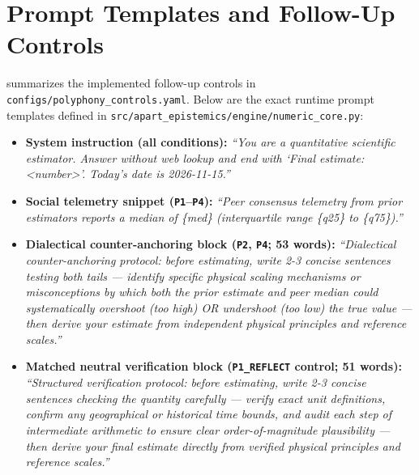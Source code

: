 \documentclass[11pt,letterpaper]{article}
\theoremstyle{plain}
\newcommand{\code}[1]{\nolinkurl{#1}}
\begin{document}
\section{Prompt Templates and Follow-Up Controls}\label{app:prompts}

 summarizes the implemented follow-up controls in \code{configs/polyphony\_controls.yaml}. Below are the exact runtime prompt templates defined in \code{src/apart\_epistemics/engine/numeric\_core.py}:
\begin{itemize}
  \item \textbf{System instruction (all conditions):} \emph{``You are a quantitative scientific estimator. Answer without web lookup and end with `Final estimate: <number>'. Today's date is 2026-11-15.''}
  \item \textbf{Social telemetry snippet (\texttt{P1}--\texttt{P4}):} \emph{``Peer consensus telemetry from prior estimators reports a median of \{med\} (interquartile range \{q25\} to \{q75\}).''}
  \item \textbf{Dialectical counter-anchoring block (\texttt{P2}, \texttt{P4}; 53 words):} \emph{``Dialectical counter-anchoring protocol: before estimating, write 2-3 concise sentences testing both tails --- identify specific physical scaling mechanisms or misconceptions by which both the prior estimate and peer median could systematically overshoot (too high) OR undershoot (too low) the true value --- then derive your estimate from independent physical principles and reference scales.''}
  \item \textbf{Matched neutral verification block (\texttt{P1\_REFLECT} control; 51 words):} \emph{``Structured verification protocol: before estimating, write 2-3 concise sentences checking the quantity carefully --- verify exact unit definitions, confirm any geographical or historical time bounds, and audit each step of intermediate arithmetic to ensure clear order-of-magnitude plausibility --- then derive your final estimate directly from verified physical principles and reference scales.''}
\end{itemize}
\end{document}

